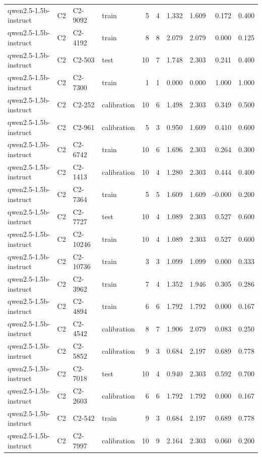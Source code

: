 \begin{table}
\begin{tabular}{llllrrrrrr}
qwen2.5-1.5b-instruct & C2 & C2-9092 & train & 5 & 4 & 1.332 & 1.609 & 0.172 & 0.400 \\
qwen2.5-1.5b-instruct & C2 & C2-4192 & train & 8 & 8 & 2.079 & 2.079 & 0.000 & 0.125 \\
qwen2.5-1.5b-instruct & C2 & C2-503 & test & 10 & 7 & 1.748 & 2.303 & 0.241 & 0.400 \\
qwen2.5-1.5b-instruct & C2 & C2-7300 & train & 1 & 1 & 0.000 & 0.000 & 1.000 & 1.000 \\
qwen2.5-1.5b-instruct & C2 & C2-252 & calibration & 10 & 6 & 1.498 & 2.303 & 0.349 & 0.500 \\
qwen2.5-1.5b-instruct & C2 & C2-961 & calibration & 5 & 3 & 0.950 & 1.609 & 0.410 & 0.600 \\
qwen2.5-1.5b-instruct & C2 & C2-6742 & train & 10 & 6 & 1.696 & 2.303 & 0.264 & 0.300 \\
qwen2.5-1.5b-instruct & C2 & C2-1413 & calibration & 10 & 4 & 1.280 & 2.303 & 0.444 & 0.400 \\
qwen2.5-1.5b-instruct & C2 & C2-7364 & train & 5 & 5 & 1.609 & 1.609 & -0.000 & 0.200 \\
qwen2.5-1.5b-instruct & C2 & C2-7727 & test & 10 & 4 & 1.089 & 2.303 & 0.527 & 0.600 \\
qwen2.5-1.5b-instruct & C2 & C2-10246 & train & 10 & 4 & 1.089 & 2.303 & 0.527 & 0.600 \\
qwen2.5-1.5b-instruct & C2 & C2-10736 & train & 3 & 3 & 1.099 & 1.099 & 0.000 & 0.333 \\
qwen2.5-1.5b-instruct & C2 & C2-3962 & train & 7 & 4 & 1.352 & 1.946 & 0.305 & 0.286 \\
qwen2.5-1.5b-instruct & C2 & C2-4894 & train & 6 & 6 & 1.792 & 1.792 & 0.000 & 0.167 \\
qwen2.5-1.5b-instruct & C2 & C2-4542 & calibration & 8 & 7 & 1.906 & 2.079 & 0.083 & 0.250 \\
qwen2.5-1.5b-instruct & C2 & C2-5852 & calibration & 9 & 3 & 0.684 & 2.197 & 0.689 & 0.778 \\
qwen2.5-1.5b-instruct & C2 & C2-7018 & test & 10 & 4 & 0.940 & 2.303 & 0.592 & 0.700 \\
qwen2.5-1.5b-instruct & C2 & C2-2603 & calibration & 6 & 6 & 1.792 & 1.792 & 0.000 & 0.167 \\
qwen2.5-1.5b-instruct & C2 & C2-542 & train & 9 & 3 & 0.684 & 2.197 & 0.689 & 0.778 \\
qwen2.5-1.5b-instruct & C2 & C2-7997 & calibration & 10 & 9 & 2.164 & 2.303 & 0.060 & 0.200 \\

\end{tabular}
\end{table}
